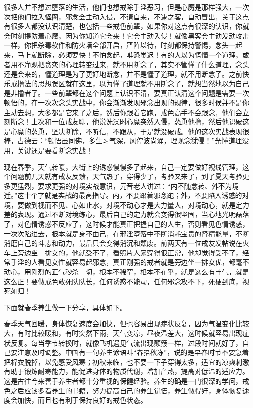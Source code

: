 很多人并不想过堕落的生活，他们也想戒除手淫恶习，但是心魔是那样强大，一次次把他们拉入怪圈，邪念会主动入侵，不请自来，不速之客，自动冒出，关于这点有很多人都没认识清楚，也包括一些戒色前辈，如果你对这点有很深的认识，你就会时刻提防着心魔，因为你知道它会来！它会主动入侵！就像黑客会主动发动攻击一样，你把杀毒软件和防火墙全部开启，严阵以待，时刻都保持警惕，念头一起来，马上就断除，必须要快！不怕念起，唯恐觉迟！有的人以为悟懂一个道理，或者用不净观把贪恋的心理转变过来，就不用断念了，其实不管懂了什么道理，念头还是会来的，懂道理是为了更好地断念，并不是懂了道理，就不用断念了。之前快乐戒撸法的思想误区就在这里，以为懂了道理就不用断念了，就想当然地以为自己是非撸者了。一些前辈都在这个问题上认识不清，要真正认清这个问题是需要一次顿悟的，在一次次念头实战中，你会渐渐发现邪念出现的规律，很多时候并不是你主动去想，大多都是它来了之后，然后你跟着它跑，戒色高手不会跟念，他们会立刻断念！上次和一位戒友聊，他说洗澡时心魔突然入侵，怂恿他撸，然后他识破这是心魔的怂恿，坚决断除，不听信，不跟从，于是就没破戒。他的这次实战表现很棒，古德云：“顿悟虽同佛，多生习气深，风停波尚涌，理现念犹侵！”光懂道理没用，关键还是要看断念实战！

现在春季，天气转暖，大街上的诱惑慢慢多了起来，自己一定要做好视线管理，这个问题前几天就有戒友反馈，天气热了，穿得少了，考验又来了，到了夏天考验更多更猛烈，要求更强的对境实战意识，元音老人讲过：“内不随念转、外不为境迁。”这十个字就是实战的最高指导。内，不要跟着邪念跑；外，不要陷入诱惑的对境，要做到视而不见、心如止水，对境不动心才是大力量人，对境动心，就是定力差的表现。通过不断对境练心，最后自己的定力就会变得很坚固，当心地光明磊落了，对色情诱惑不反应了，这时候才能真正把握自己的人生，否则看见色情诱惑，一次次陷进去，根本就是身不由己，在邪淫堕落中不断消耗宝贵的肾精能量，不断消磨自己的斗志和动力，最后只会变得消沉和颓废。前两天有一位戒友发帖说在火车上旁边坐一排女的，他就受不了，看照片人家穿得很正常，他却觉得受不了，经常手淫的人看见女性就容易起邪念，真正刚强的戒者就是旁边坐一排女优，都毫不动心，用刚烈的正气秒杀一切，根本不稀罕，根本不在乎，就是这么有骨气，就是这么正！要做戒色敢死队队长，任何诱惑不能动，任何邪念攻不下，死硬到底，视死如归！

下面就春季养生做一下分享，具体如下。

春季天气回暖，身体恢复速度会加快，但也容易出现症状反复，因为气温变化比较大，有时比较暖和，有时突然下雨，天气变凉，昼夜温差大，这时候就容易出现症状反复。每当季节转换时，就像飞机遇见气流出现颠簸一样，过段时间就好了，自己要注意及时调整。中国有一句养生谚语叫“春捂秋冻”，说的是早春时节不要急着把棉衣脱掉，以免感受风寒；初秋来临，也不要一下子穿得太多，适宜的凉爽刺激有助于锻炼耐寒能力，能促进身体的物质代谢，增加产热，提高对低温的适应力。这是古往今来善于养生者都十分重视的保健经验。养生的确是一门很深的学问，戒色之后应该多看养生的书籍，努力提高自己的养生觉悟，养生做得好，身体恢复速度会加快，而且也有利于保持良好的戒色状态。

